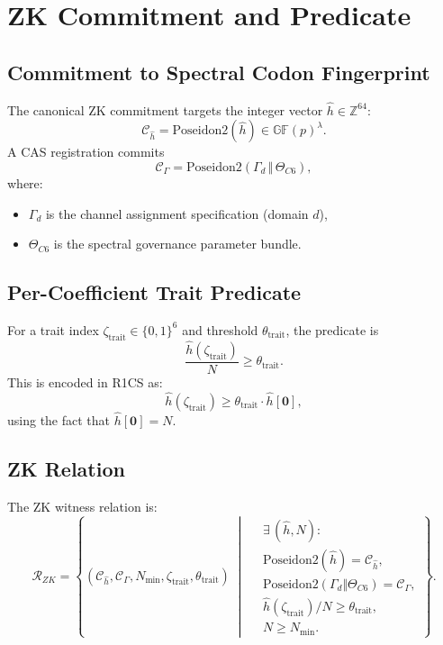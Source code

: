 \documentclass[11pt]{article}
\begin{document}
\section{ZK Commitment and Predicate}

\subsection{Commitment to Spectral Codon Fingerprint}

The canonical ZK commitment targets the integer vector
$\hat{h} \in \mathbb{Z}^{64}$:
\[
  \mathcal{C}_{\hat{h}} = \text{Poseidon2}(\hat{h})
  \in \mathbb{GF}(p)^\lambda.
\]
A CAS registration commits
\[
  \mathcal{C}_\Gamma = \text{Poseidon2}(\Gamma_d \,\Vert\, \Theta_{C6}),
\]
where:
\begin{itemize}[noitemsep]
  \item $\Gamma_d$ is the channel assignment specification (domain $d$),
  \item $\Theta_{C6}$ is the spectral governance parameter bundle.
\end{itemize}

\subsection{Per-Coefficient Trait Predicate}

For a trait index $\zeta_{\text{trait}} \in \{0,1\}^6$ and threshold
$\theta_{\text{trait}}$, the predicate is
\[
  \frac{\hat{h}(\zeta_{\text{trait}})}{N} \ge \theta_{\text{trait}}.
\]
This is encoded in R1CS as:
\[
  \hat{h}(\zeta_{\text{trait}}) \ge
  \theta_{\text{trait}} \cdot \hat{h}[\mathbf{0}],
\]
using the fact that $\hat{h}[\mathbf{0}] = N$.

\subsection{ZK Relation}

The ZK witness relation is:
\[
  \mathcal{R}_{ZK} =
  \left\{
    (\mathcal{C}_{\hat{h}}, \mathcal{C}_\Gamma, N_{\min}, \zeta_{\text{trait}}, \theta_{\text{trait}})
    \;\middle|\;
    \begin{aligned}
      &\exists\, (\hat{h}, N):\\
      &\text{Poseidon2}(\hat{h}) = \mathcal{C}_{\hat{h}},\\
      &\text{Poseidon2}(\Gamma_d \Vert \Theta_{C6}) = \mathcal{C}_\Gamma,\\
      &\hat{h}(\zeta_{\text{trait}})/N \ge \theta_{\text{trait}},\\
      &N \ge N_{\min}.
    \end{aligned}
  \right\}.
\]
\end{document}
